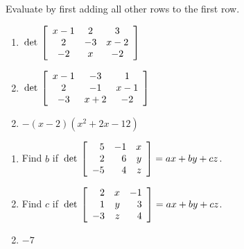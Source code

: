 \begin{multicols}{2}
\begin{ex}
Evaluate by first adding all other rows to the first row.


\begin{enumerate}[label={\alph*.}]
\item $\thinspace\operatorname{det \medspace} \left[ \begin{array}{ccc}
x-1 & 2 & 3 \\
2 & -3 & x-2 \\
-2 & x & -2
\end{array}\right]$


\item $\thinspace\operatorname{det \medspace} \left[ \begin{array}{ccc}
x-1 & -3 & 1 \\
2 & -1 & x-1 \\
-3 & x+2 & -2
\end{array}\right]$


\end{enumerate}
\begin{sol}
\begin{enumerate}[label={\alph*.}]
\setcounter{enumi}{1}
\item  $-(x-2)(x^2 + 2x-12)$

\end{enumerate}
\end{sol}
\end{ex}

\begin{ex}
\begin{enumerate}[label={\alph*.}]
\item Find $b$ if 
$\thinspace\operatorname{det\medspace} \left[ \begin{array}{rrr}
5 & -1 & x \\
2 & 6 & y \\
-5 & 4 & z
\end{array}\right] = ax + by + cz$.

\item Find $c$ if 
$\thinspace\operatorname{det\medspace} \left[ \begin{array}{rrr}
2 & x & -1 \\
1 & y & 3 \\
-3 & z & 4
\end{array}\right] = ax + by + cz$.

\end{enumerate}
\begin{sol}
\begin{enumerate}[label={\alph*.}]
\setcounter{enumi}{1}
\item  $-7$


\end{enumerate}
\end{sol}
\end{ex}
\end{multicols}
